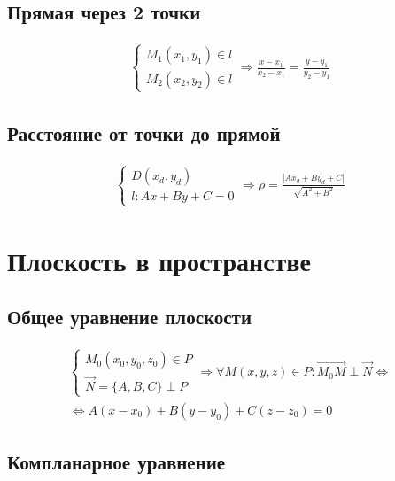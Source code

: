 \documentclass{article}
\begin{document}
\subsection{Прямая через 2 точки}

\begin{gather*}
	\begin{cases}
		M_1(x_1, y_1) \in l \\
		M_2(x_2, y_2) \in l
	\end{cases} \Rightarrow \frac{x - x_1}{x_2 - x_1} = \frac{y - y_1}{y_2 - y_1}
\end{gather*}

\subsection{Расстояние от точки до прямой}

\begin{gather*}
	\begin{cases}
		D(x_d, y_d) \\
		l: Ax + By + C = 0
	\end{cases} \Rightarrow \rho = \frac{|Ax_d + By_d + C|}{\sqrt{A^2 + B^2}}
\end{gather*}

\section{Плоскость в пространстве}

\subsection{Общее уравнение плоскости}

\begin{gather*}
	\begin{cases}
		M_0(x_0, y_0, z_0) \in P \\
		\vec{N} = \{ A, B, C \} \perp P
	\end{cases} \Rightarrow \forall M(x, y, z) \in P : \vec{M_0 M} \perp \vec{N} \Leftrightarrow \\
	\Leftrightarrow A(x - x_0) + B(y - y_0) + C(z - z_0) = 0
\end{gather*}

\subsection{Компланарное уравнение}
\end{document}
